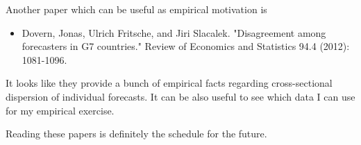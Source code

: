 \documentclass{article}
\begin{document}
{Another paper which can be useful as empirical motivation is 
\begin{itemize}
	\item Dovern, Jonas, Ulrich Fritsche, and Jiri Slacalek. "Disagreement among forecasters in G7 countries." Review of Economics and Statistics 94.4 (2012): 1081-1096.
\end{itemize}
It looks like they provide a bunch of empirical facts regarding cross-sectional dispersion of individual forecasts. It can be also useful to see which data I can use for my empirical exercise.

Reading these papers is definitely the schedule for the future.



}
\end{document}
